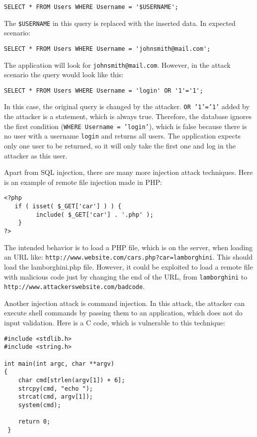\documentclass[a4paper]{article}
\begin{document}
\begin{verbatim}
SELECT * FROM Users WHERE Username = '$USERNAME';
\end{verbatim}

The \texttt{\$USERNAME} in this query is replaced with the inserted data. In
expected scenario:

\begin{verbatim}
SELECT * FROM Users WHERE Username = 'johnsmith@mail.com';
\end{verbatim}

The application will look for \texttt{johnsmith@mail.com}. However, in the
attack scenario the query would look like this:

\begin{verbatim}
SELECT * FROM Users WHERE Username = 'login' OR '1'='1';
\end{verbatim}

In this case, the original query is changed by the attacker. \texttt{OR
'1'='1'} added by the attacker is a statement, which is always true. Therefore,
the database ignores the first condition (\texttt{WHERE Username = 'login'}),
which is false because there is no user with a username \texttt{login} and
returns all users. The application expects only one user to be returned, so it
will only take the first one and log in the attacker as this user.

Apart from SQL injection, there are many more injection attack techniques. Here
is an example of remote file injection made in PHP:

\begin{verbatim}
<?php
   if ( isset( $_GET['car'] ) ) {
         include( $_GET['car'] . '.php' );
    }
?>
\end{verbatim}

The intended behavior is to load a PHP file, which is on the server, when
loading an URL like: \texttt{http://www.website.com/cars.php?car=lamborghini}.
This should load the lamborghini.php file. However, it could be exploited to
load a remote file with malicious code just by changing the end of the URL,
from \texttt{lamborghini} to \texttt{http://www.attackerswebsite.com/badcode}.

Another injection attack is command injection. In this attack, the attacker can
execute shell commands by passing them to an application, which does not do
input validation. Here is a C code, which is vulnerable to this technique:

\begin{verbatim}
#include <stdlib.h>
#include <string.h>

int main(int argc, char **argv)
{
	char cmd[strlen(argv[1]) + 6];
	strcpy(cmd, "echo ");
	strcat(cmd, argv[1]);
	system(cmd);
        
	return 0;
 }
\end{verbatim}
\end{document}
